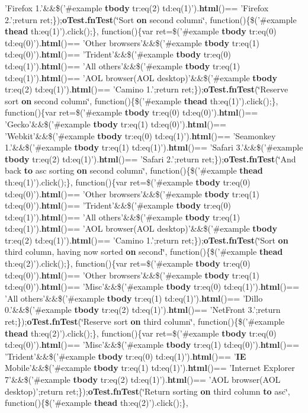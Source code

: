 {{\begin{DoxyParamCaption}
'Firefox 1.'\&\&\$('\#example {\bf tbody} tr\+:eq(2) td\+:eq(1)').{\bf html}()== 'Firefox 2.';return ret;\});{\bf o\+Test.\+fn\+Test}(\char`\"{}Sort {\bf on} second column\char`\"{}, function()\{\$('\#example {\bf thead} th\+:eq(1)').click();\}, function()\{var ret=\$('\#example {\bf tbody} tr\+:eq(0) td\+:eq(0)').{\bf html}()== 'Other browsers'\&\&\$('\#example {\bf tbody} tr\+:eq(1) td\+:eq(0)').{\bf html}()== 'Trident'\&\&\$('\#example {\bf tbody} tr\+:eq(0) td\+:eq(1)').{\bf html}()== 'All others'\&\&\$('\#example {\bf tbody} tr\+:eq(1) td\+:eq(1)').{\bf html}()== 'A\+O\+L browser(A\+O\+L desktop)'\&\&\$('\#example {\bf tbody} tr\+:eq(2) td\+:eq(1)').{\bf html}()== 'Camino 1.';return ret;\});{\bf o\+Test.\+fn\+Test}(\char`\"{}Reserve sort {\bf on} second column\char`\"{}, function()\{\$('\#example {\bf thead} th\+:eq(1)').click();\}, function()\{var ret=\$('\#example {\bf tbody} tr\+:eq(0) td\+:eq(0)').{\bf html}()== 'Gecko'\&\&\$('\#example {\bf tbody} tr\+:eq(1) td\+:eq(0)').{\bf html}()== 'Webkit'\&\&\$('\#example {\bf tbody} tr\+:eq(0) td\+:eq(1)').{\bf html}()== 'Seamonkey 1.'\&\&\$('\#example {\bf tbody} tr\+:eq(1) td\+:eq(1)').{\bf html}()== 'Safari 3.'\&\&\$('\#example {\bf tbody} tr\+:eq(2) td\+:eq(1)').{\bf html}()== 'Safari 2.';return ret;\});{\bf o\+Test.\+fn\+Test}(\char`\"{}And back {\bf to} asc sorting {\bf on} second column\char`\"{}, function()\{\$('\#example {\bf thead} th\+:eq(1)').click();\}, function()\{var ret=\$('\#example {\bf tbody} tr\+:eq(0) td\+:eq(0)').{\bf html}()== 'Other browsers'\&\&\$('\#example {\bf tbody} tr\+:eq(1) td\+:eq(0)').{\bf html}()== 'Trident'\&\&\$('\#example {\bf tbody} tr\+:eq(0) td\+:eq(1)').{\bf html}()== 'All others'\&\&\$('\#example {\bf tbody} tr\+:eq(1) td\+:eq(1)').{\bf html}()== 'A\+O\+L browser(A\+O\+L desktop)'\&\&\$('\#example {\bf tbody} tr\+:eq(2) td\+:eq(1)').{\bf html}()== 'Camino 1.';return ret;\});{\bf o\+Test.\+fn\+Test}(\char`\"{}Sort {\bf on} third column, having now sorted {\bf on} second\char`\"{}, function()\{\$('\#example {\bf thead} th\+:eq(2)').click();\}, function()\{var ret=\$('\#example {\bf tbody} tr\+:eq(0) td\+:eq(0)').{\bf html}()== 'Other browsers'\&\&\$('\#example {\bf tbody} tr\+:eq(1) td\+:eq(0)').{\bf html}()== 'Misc'\&\&\$('\#example {\bf tbody} tr\+:eq(0) td\+:eq(1)').{\bf html}()== 'All others'\&\&\$('\#example {\bf tbody} tr\+:eq(1) td\+:eq(1)').{\bf html}()== 'Dillo 0.'\&\&\$('\#example {\bf tbody} tr\+:eq(2) td\+:eq(1)').{\bf html}()== 'Net\+Front 3.';return ret;\});{\bf o\+Test.\+fn\+Test}(\char`\"{}Reserve sort {\bf on} third column\char`\"{}, function()\{\$('\#example {\bf thead} th\+:eq(2)').click();\}, function()\{var ret=\$('\#example {\bf tbody} tr\+:eq(0) td\+:eq(0)').{\bf html}()== 'Misc'\&\&\$('\#example {\bf tbody} tr\+:eq(1) td\+:eq(0)').{\bf html}()== 'Trident'\&\&\$('\#example {\bf tbody} tr\+:eq(0) td\+:eq(1)').{\bf html}()== '{\bf I\+E} Mobile'\&\&\$('\#example {\bf tbody} tr\+:eq(1) td\+:eq(1)').{\bf html}()== 'Internet Explorer 7'\&\&\$('\#example {\bf tbody} tr\+:eq(2) td\+:eq(1)').{\bf html}()== 'A\+O\+L browser(A\+O\+L desktop)';return ret;\});{\bf o\+Test.\+fn\+Test}(\char`\"{}Return sorting {\bf on} third column {\bf to} asc\char`\"{}, function()\{\$('\#example {\bf thead} th\+:eq(2)').click();\}, 
\end{DoxyParamCaption}}}
